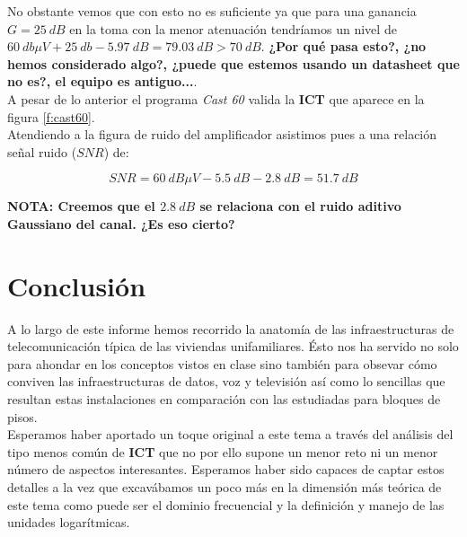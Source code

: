 \documentclass{article}[12 pt]
\begin{document}
			No obstante vemos que con esto no es suficiente ya que para una ganancia $G = 25\ dB$ en la toma con la menor atenuación tendríamos un nivel de $60\ db\mu V + 25\ db - 5.97\ dB = 79.03\ dB > 70\ dB$. \textbf{¿Por qué pasa esto?, ¿no hemos considerado algo?, ¿puede que estemos usando un datasheet que no es?, el equipo es antiguo...}.\\

			A pesar de lo anterior el programa \textit{Cast 60} valida la \textbf{ICT} que aparece en la figura \ref{f:cast60}.\\

			Atendiendo a la figura de ruido del amplificador asistimos pues a una relación señal ruido ($SNR$) de:

			$$SNR = 60\ dB\mu V - 5.5\ dB - 2.8\ dB = 51.7\ dB$$

			\textbf{NOTA: Creemos que el $2.8\ dB$ se relaciona con el ruido aditivo Gaussiano del canal. ¿Es eso cierto?}

	\section{Conclusión}
		A lo largo de este informe hemos recorrido la anatomía de las infraestructuras de telecomunicación típica de las viviendas unifamiliares. Ésto nos ha servido no solo para ahondar en los conceptos vistos en clase sino también para obsevar cómo conviven las infraestructuras de datos, voz y televisión así como lo sencillas que resultan estas instalaciones en comparación con las estudiadas para bloques de pisos.\\

		Esperamos haber aportado un toque original a este tema a través del análisis del tipo menos común de \textbf{ICT} que no por ello supone un menor reto ni un menor número de aspectos interesantes. Esperamos haber sido capaces de captar estos detalles a la vez que excavábamos un poco más en la dimensión más teórica de este tema como puede ser el dominio frecuencial y la definición y manejo de las unidades logarítmicas.\\
\end{document}
